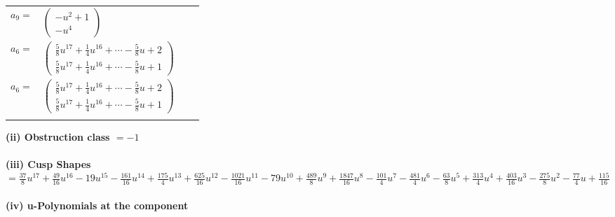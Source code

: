 \documentclass[1p]{elsarticle_modified}
\theoremstyle{definition}
\begin{document}
\begin{tabular}{m{7pt} m{180pt} m{7pt} m{180pt} }
\flushright $a_{9}=$&$\begin{pmatrix}- u^2+1\\- u^4\end{pmatrix}$ \\
\flushright $a_{6}=$&$\begin{pmatrix}\frac{5}{8} u^{17}+\frac{1}{4} u^{16}+\cdots-\frac{5}{8} u+2\\\frac{5}{8} u^{17}+\frac{1}{4} u^{16}+\cdots-\frac{5}{8} u+1\end{pmatrix}$\\ \flushright $a_{6}=$&$\begin{pmatrix}\frac{5}{8} u^{17}+\frac{1}{4} u^{16}+\cdots-\frac{5}{8} u+2\\\frac{5}{8} u^{17}+\frac{1}{4} u^{16}+\cdots-\frac{5}{8} u+1\end{pmatrix}$\\&\end{tabular}
\flushleft \textbf{(ii) Obstruction class $= -1$}\\~\\
\flushleft \textbf{(iii) Cusp Shapes $= \frac{37}{8} u^{17}+\frac{49}{16} u^{16}-19 u^{15}-\frac{161}{16} u^{14}+\frac{175}{4} u^{13}+\frac{625}{16} u^{12}-\frac{1021}{16} u^{11}-79 u^{10}+\frac{489}{8} u^9+\frac{1847}{16} u^8-\frac{101}{4} u^7-\frac{481}{4} u^6-\frac{63}{8} u^5+\frac{313}{4} u^4+\frac{403}{16} u^3-\frac{275}{8} u^2-\frac{77}{4} u+\frac{115}{16}$}\\~\\
\newpage\renewcommand{\arraystretch}{1}
\flushleft \textbf{(iv) u-Polynomials at the component}\newline \\
\end{document}
